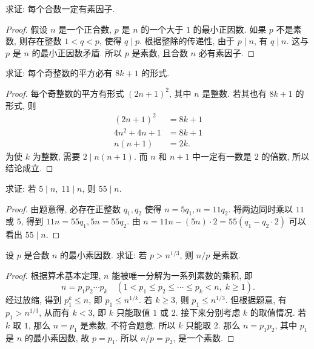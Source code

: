 \documentclass[a5paper,fleqn,10pt]{article}
\begin{document}
\begin{exmp}
    求证: 每个合数一定有素因子.
    \begin{proof}
        假设 $n$ 是一个正合数, $p$ 是 $n$ 的一个大于 $1$ 的最小正因数. 如果 $p$ 不是素数, 则存在整数 $1<q<p$,
        使得 $q\mid p$. 根据整除的传递性, 由于 $p\mid n$, 有 $q\mid n$. 这与 $p$ 是 $n$ 的最小正因数矛盾.
        所以 $p$ 是素数, 且合数 $n$ 必有素因子.
    \end{proof}
\end{exmp}

\begin{exmp}
    求证: 每个奇整数的平方必有 $8k+1$ 的形式.
    \begin{proof}
        每个奇整数的平方有形式 $(2n+1)^2$, 其中 $n$ 是整数. 若其也有 $8k+1$ 的形式, 则
        \begin{align*}
            (2n+1)^2  & =8k+1 \\
            4n^2+4n+1 & =8k+1 \\
            n(n+1)    & =2k.
        \end{align*}
        为使 $k$ 为整数, 需要 $2\mid n(n+1)$. 而 $n$ 和 $n+1$ 中一定有一数是 $2$ 的倍数, 所以结论成立.
    \end{proof}
\end{exmp}

\begin{exmp}
    求证: 若 $5\mid n,\;11\mid n$, 则 $55\mid n$.
    \begin{proof}
        由题意得, 必存在正整数 $q_1,q_2$ 使得 $n=5q_1,n=11q_2$. 将两边同时乘以 $11$ 或 $5$, 得到
        $11n=55q_1,5n=55q_2$. 由 $n=11n-(5n)\cdot 2=55(q_1-q_2\cdot 2)$ 可以看出 $55\mid n$.
    \end{proof}
\end{exmp}

\begin{exmp}
    设 $p$ 是合数 $n$ 的最小素因数. 求证: 若 $p>n^{1/3}$, 则 $n/p$ 是素数.
    \begin{proof}
        根据算术基本定理, $n$ 能被唯一分解为一系列素数的乘积, 即
        \[
            n=p_1p_2\cdots p_k\quad(1<p_1\leq p_2\leq\cdots\leq p_k<n,\;k\geq1).
        \]
        经过放缩, 得到 $p_1^k\leq n$, 即 $p_1\leq n^{1/k}$. 若 $k\geq3$, 则 $p_1\leq n^{1/3}$. 但根据题意, 有 $p_1>n^{1/3}$,
        从而有 $k<3$, 即 $k$ 只能取值 $1$ 或 $2$. 接下来分别考虑 $k$ 的取值情况. 若 $k$ 取 $1$, 那么 $n=p_1$ 是素数, 不符合题意.
        所以 $k$ 只能取 $2$. 那么 $n=p_1p_2$, 其中 $p_1$ 是 $n$ 的最小素因数, 故 $p=p_1$. 所以 $n/p=p_2$, 是一个素数.
    \end{proof}
\end{exmp}
\end{document}

